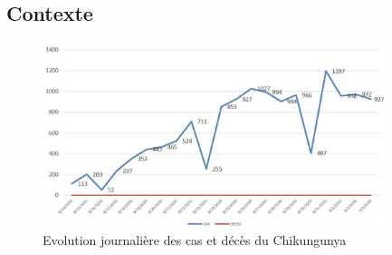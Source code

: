 \subsection{Contexte}

\begin{figure}[!h]
	\begin{center}
		\includegraphics[width=10cm]{images/statsCaseChad}
	\end{center}
	\caption{ Evolution journalière des cas et décès du Chikungunya}
	\label{fig:chikvevolution}
\end{figure}